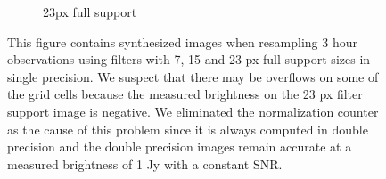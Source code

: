 \begin{figure}[ht!]
\begin{mdframed}
\begin{subfigure}[b]{0.45\textwidth}
      \caption{23px full support}
    \end{subfigure}
    \caption[Precision error in simulated 3 hour MeerKAT observations]{This figure contains synthesized images when resampling 3 hour observations using filters with 7, 15 and 23 px full support sizes in single precision. We suspect 
    that there may be overflows on some of the grid cells because the measured brightness on the 23 px filter support image is negative. We eliminated the normalization counter as the cause of this problem since it is always computed in double precision
    and the double precision images remain accurate at a measured brightness of 1 Jy with a constant SNR.}
    \label{FIG_PREC_ERROR_IMAGES}
 \end{mdframed}
\end{figure}
